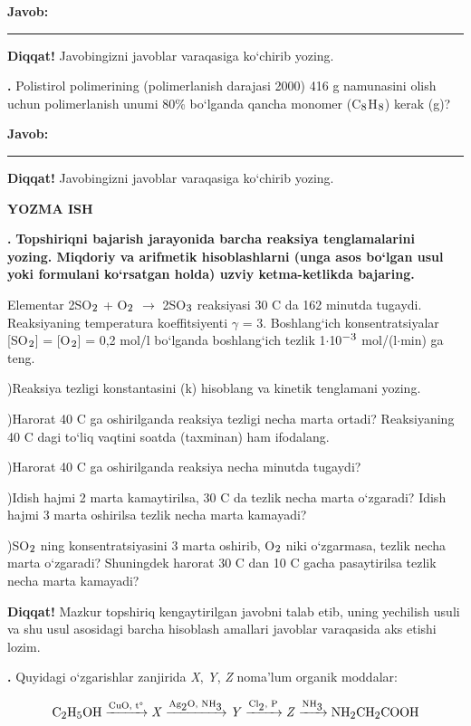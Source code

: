 \documentclass[11pt,a4paper]{article}
\renewcommand{\textsubscript}[1]{\ensuremath{_{\text{\fontsize{8}{8}\selectfont #1}}}}
\renewcommand{\textsuperscript}[1]{\ensuremath{^{\text{\fontsize{8}{8}\selectfont #1}}}}
\newcommand{\qn}[1]{\textbf{\fontsize{11.5}{13}\selectfont #1}}
\newcommand{\qsep}{\par\vspace{1pt}\noindent\rule{0pt}{0.4pt}\par\vspace{5pt}}
\newcommand{\diqqat}[1]{\par\smallskip\noindent\textbf{Diqqat!} #1\par\medskip}
\newcommand{\javob}{\par\smallskip\noindent\textbf{Javob:} \rule[-2pt]{7.5cm}{0.4pt}\par\smallskip\noindent\textbf{Diqqat!} Javobingizni javoblar varaqasiga ko`chirib yozing.\par\medskip}
\begin{document}
\javob\qsep
\noindent\qn{40.} Polistirol polimerining (polimerlanish darajasi 2000) 416 g namunasini olish uchun polimerlanish unumi 80\% bo`lganda qancha monomer (C\textsubscript{8}H\textsubscript{8}) kerak (g)?
\javob\qsep
\par\bigskip\begin{center}\textbf{\fontsize{13}{15}\selectfont YOZMA ISH}\end{center}
\noindent\qn{41.} \textbf{Topshiriqni bajarish jarayonida barcha reaksiya tenglamalarini yozing. Miqdoriy va arifmetik hisoblashlarni (unga asos bo`lgan usul yoki formulani ko`rsatgan holda) uzviy ketma-ketlikda bajaring.}\par\smallskip
Elementar 2SO\textsubscript{2} + O\textsubscript{2} $\to$ 2SO\textsubscript{3} reaksiyasi 30 \textdegree{}C da 162 minutda tugaydi. Reaksiyaning temperatura koeffitsiyenti $\gamma$ = 3. Boshlang`ich konsentratsiyalar [SO\textsubscript{2}] = [O\textsubscript{2}] = 0,2 mol/l bo`lganda boshlang`ich tezlik 1$\cdot$10\textsuperscript{$-$3} mol/(l$\cdot$min) ga teng.\par
{})Reaksiya tezligi konstantasini (k) hisoblang va kinetik tenglamani yozing.\par
{})Harorat 40 \textdegree{}C ga oshirilganda reaksiya tezligi necha marta ortadi? Reaksiyaning 40 \textdegree{}C dagi to`liq vaqtini soatda (taxminan) ham ifodalang.\par
{})Harorat 40 \textdegree{}C ga oshirilganda reaksiya necha minutda tugaydi?\par
{})Idish hajmi 2 marta kamaytirilsa, 30 \textdegree{}C da tezlik necha marta o`zgaradi? Idish hajmi 3 marta oshirilsa tezlik necha marta kamayadi?\par
{})SO\textsubscript{2} ning konsentratsiyasini 3 marta oshirib, O\textsubscript{2} niki o`zgarmasa, tezlik necha marta o`zgaradi? Shuningdek harorat 30 \textdegree{}C dan 10 \textdegree{}C gacha pasaytirilsa tezlik necha marta kamayadi?\par
\diqqat{Mazkur topshiriq kengaytirilgan javobni talab etib, uning yechilish usuli va shu usul asosidagi barcha hisoblash amallari javoblar varaqasida aks etishi lozim.}\qsep
\noindent\qn{42.} Quyidagi o`zgarishlar zanjirida \textit{X}, \textit{Y}, \textit{Z} noma'lum organik moddalar:\par
\[\setlength{\fboxsep}{0pt}\text{C\textsubscript{2}H\textsubscript{5}OH}\xrightarrow{\text{CuO, t\textdegree{}}}\text{\textit{X}}\xrightarrow{\text{Ag\textsubscript{2}O, NH\textsubscript{3}}}\text{\textit{Y}}\xrightarrow{\text{Cl\textsubscript{2}, P}}\text{\textit{Z}}\xrightarrow{\text{NH\textsubscript{3}}}\text{NH\textsubscript{2}CH\textsubscript{2}COOH}\]
\end{document}
